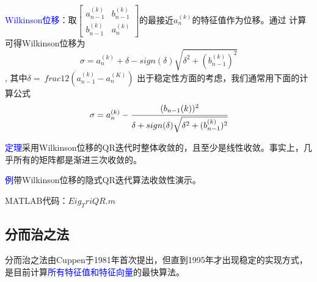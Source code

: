 \documentclass[12pt,a4paper]{article}
\begin{document}
\textcolor{blue}{Wilkinson位移：}取$\begin{bmatrix}a_{n-1}^{(k)}&b_{n-1}^{(k)}\\
b_{n-1}^{(k)}&a_n^{(k)} \end{bmatrix}$的最接近$a_n^{(k)}$的特征值作为位移。通过
计算可得Wilkinson位移为
$$\sigma =a_n^{(k)}+\delta -sign(\delta)\sqrt{\delta
	^2+(b_{n-1}^{(k)})^2}$$,
其中$\delta=\
frac{1}{2}(a_{n-1}^{(k)}-a_n^{(K)})$
出于稳定性方面的考虑，我们通常用下面的计算公式\begin{equation}
\sigma=a_n^{(k)}-\cfrac{(b_{n-1}{(k)})^2}{\delta +sign(\delta)\sqrt{\delta
		^2+(b_{n-1}^{(k)})^2}}
\end{equation}

\textcolor{blue}{定理}\quad 采用Wilkinson位移的QR迭代时整体收敛的，且至少是线性收敛。事实上，几乎所有的矩阵都是渐进三次收敛的。

\textcolor{blue}{例}\quad 带Wilkinson位移的隐式QR迭代算法收敛性演示。

MATLAB代码：$Eig_TriQR.m$
\subsection{分而治之法}
分而治之法由Cuppen于1981年首次提出，但直到1995年才出现稳定的实现方式，是目前计算\textcolor{blue}{所有特征值和特征向量}的最快算法。
\end{document}
